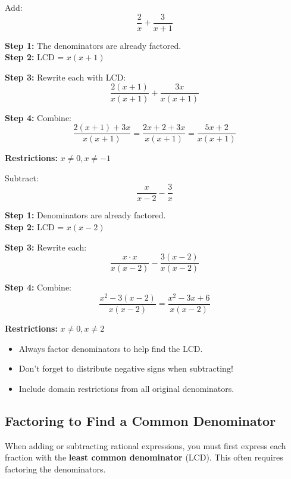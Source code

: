 \documentclass[11pt]{article}
\begin{document}
\begin{tcolorbox}
Add:
\[
\frac{2}{x} + \frac{3}{x + 1}
\]

\textbf{Step 1:} The denominators are already factored. \\
\textbf{Step 2:} LCD = \( x(x + 1) \)

\textbf{Step 3:} Rewrite each with LCD:
\[
\frac{2(x + 1)}{x(x + 1)} + \frac{3x}{x(x + 1)}
\]

\textbf{Step 4:} Combine:
\[
\frac{2(x + 1) + 3x}{x(x + 1)} = \frac{2x + 2 + 3x}{x(x + 1)} = \frac{5x + 2}{x(x + 1)}
\]

\textbf{Restrictions:} \( x \neq 0, x \neq -1 \)

\end{tcolorbox}

\begin{tcolorbox}
Subtract:
\[
\frac{x}{x - 2} - \frac{3}{x}
\]

\textbf{Step 1:} Denominators are already factored. \\
\textbf{Step 2:} LCD = \( x(x - 2) \)

\textbf{Step 3:} Rewrite each:
\[
\frac{x \cdot x}{x(x - 2)} - \frac{3(x - 2)}{x(x - 2)}
\]

\textbf{Step 4:} Combine:
\[
\frac{x^2 - 3(x - 2)}{x(x - 2)} = \frac{x^2 - 3x + 6}{x(x - 2)}
\]

\textbf{Restrictions:} \( x \neq 0, x \neq 2 \)

\end{tcolorbox}

\begin{tcolorbox}[colback=yellow!5!white, colframe=yellow!80!black, title=Note]
\begin{itemize}
  \item Always factor denominators to help find the LCD.
  \item Don’t forget to distribute negative signs when subtracting!
  \item Include domain restrictions from all original denominators.
\end{itemize}
\end{tcolorbox}

\subsection{Factoring to Find a Common Denominator}

When adding or subtracting rational expressions, you must first express each fraction with the \textbf{least common denominator} (LCD). This often requires factoring the denominators.
\end{document}
